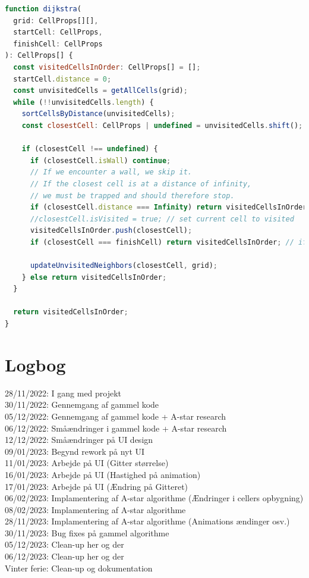 \documentclass[12pt]{article}
\begin{document}
\newpage
\begin{lstlisting}[language=JavaScript, caption=Udvalgt kode af Dijkstra's algoritmen, label={lst:Dijkstra}]
function dijkstra(
  grid: CellProps[][],
  startCell: CellProps,
  finishCell: CellProps
): CellProps[] {
  const visitedCellsInOrder: CellProps[] = [];
  startCell.distance = 0;
  const unvisitedCells = getAllCells(grid);
  while (!!unvisitedCells.length) {
    sortCellsByDistance(unvisitedCells);
    const closestCell: CellProps | undefined = unvisitedCells.shift();

    if (closestCell !== undefined) {
      if (closestCell.isWall) continue;
      // If we encounter a wall, we skip it.
      // If the closest cell is at a distance of infinity,
      // we must be trapped and should therefore stop.
      if (closestCell.distance === Infinity) return visitedCellsInOrder;
      //closestCell.isVisited = true; // set current cell to visited
      visitedCellsInOrder.push(closestCell);
      if (closestCell === finishCell) return visitedCellsInOrder; // if reached finishcell

      updateUnvisitedNeighbors(closestCell, grid);
    } else return visitedCellsInOrder;
  }

  return visitedCellsInOrder;
}
\end{lstlisting}

\section*{Logbog}
28/11/2022: I gang med projekt \\
30/11/2022: Gennemgang af gammel kode \\
05/12/2022: Gennemgang af gammel kode + A-star research \\
06/12/2022: Småændringer i gammel kode + A-star research \\
12/12/2022: Småændringer på UI design \\
09/01/2023: Begynd rework på nyt UI \\
11/01/2023: Arbejde på UI (Gitter størrelse) \\
16/01/2023: Arbejde på UI (Hastighed på animation)\\
17/01/2023: Arbejde på UI (Ændring på Gitteret)\\
06/02/2023: Implamentering af A-star algorithme (Ændringer i cellers opbygning) \\
08/02/2023: Implamentering af A-star algorithme \\
28/11/2023: Implamentering af A-star algorithme (Animations ændinger osv.)\\
30/11/2023: Bug fixes på gammel algorithme \\
05/12/2023: Clean-up her og der\\
06/12/2023: Clean-up her og der\\
Vinter ferie: Clean-up og dokumentation \\
\end{document}
